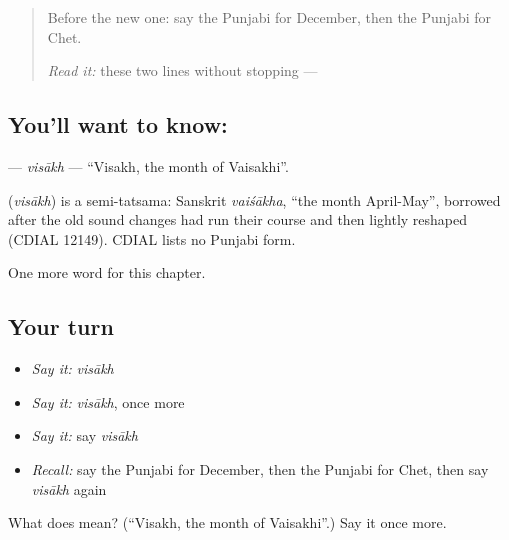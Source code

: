 \label{lesson:PA-C103-visakh}



\begin{quote}
Before the new one: say the Punjabi for December, then the Punjabi for Chet.

\emph{Read it:} these two lines without stopping — \textbf{       }
\end{quote}

\subsection*{You'll want to know: }
\textbf{} — \emph{visākh} — \textquotedblleft{}Visakh, the month of Vaisakhi\textquotedblright{}.

\begin{cousinweb}
\textbf{} (\emph{visākh}) is a semi-tatsama: Sanskrit \emph{vaiśākha}, \textquotedblleft{}the month April-May\textquotedblright{}, borrowed after the old sound changes had run their course and then lightly reshaped (CDIAL 12149). CDIAL lists no Punjabi form.
\end{cousinweb}

\begin{grammarlens}[title={What you've built}]
One more word for this chapter.
\end{grammarlens}

\subsection*{Your turn}
\begin{itemize}
\raggedright
  \item \emph{Say it:} \emph{visākh}
  \item \emph{Say it:} \emph{visākh}, once more
  \item \emph{Say it:} say \emph{visākh}
  \item \emph{Recall:} say the Punjabi for December, then the Punjabi for Chet, then say \emph{visākh} again
\end{itemize}

\begin{tcolorbox}[breakable,colback=teal!4,colframe=teal!35!black,title={Before you move on}]
What does  mean? (\textquotedblleft{}Visakh, the month of Vaisakhi\textquotedblright{}.) Say it once more.
\end{tcolorbox}
